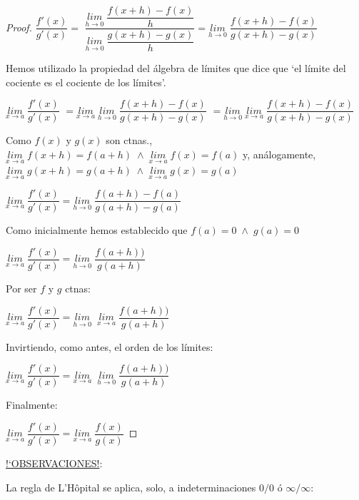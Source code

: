 	 
	\begin{proof}
		 
		 $\dfrac {f'(x)}{g'(x)}= $
		 $\dfrac 
		  { \underset {h\to 0}{lim}\;{\dfrac {f(x+h)-f(x)}{h}}} { \underset {h\to 0}{lim}\;{\dfrac {g(x+h)-g(x)}{h}} }= \underset {h\to 0}{lim}\;{\dfrac {f(x+h)-f(x)}{g(x+h)-g(x)}} $
		  
		  Hemos utilizado la propiedad del álgebra de límites que dice que `el límite del cociente es el cociente de los límites'.
		  
		  $\underset {x\to a}{lim }\; {\dfrac {f'(x)}{g'(x)}}$
		  $=\underset {x\to a}{lim} \; \underset {h\to 0}{lim}\; { \dfrac {f(x+h)-f(x)}{g(x+h)-g(x)}  }$
		   $=\underset {h\to 0}{lim} \; \underset {x\to a}{lim}\; { \dfrac {f(x+h)-f(x)}{g(x+h)-g(x)}  }$
		   
		   Como $f(x)$ y $g(x)$ son ctnas., $\underset {x\to a}{lim}\;{f(x+h)}=f(a+h) \; \wedge \; \underset {x\to a}{lim}\;{f(x)}=f(a) $ y, análogamente, $\underset {x\to a}{lim}\;{g(x+h)}=g(a+h) \; \wedge \; \underset {x\to a}{lim}\;{g(x)}=g(a) $ 
		   
		    $\underset {x\to a}{lim }\; {\dfrac {f'(x)}{g'(x)}}=\underset {h\to 0}{lim}\; { \dfrac {f(a+h)-f(a)}{g(a+h)-g(a)}}$
		    
		    Como inicialmente hemos establecido que $f(a)=0 \; \wedge \; g(a)=0$
		    
		      $ \underset {x\to a}{lim}\;{\dfrac {f'(x)}{g'(x)}}=\underset {h\to 0}{lim}\; { \dfrac {f(a+h))}{g(a+h)}}$
		      
		      Por ser $f$ y $g$ ctnas:
		      
		       $ \underset {x\to a}{lim}\; {\dfrac {f'(x)}{g'(x)}}=
		       \underset {h\to 0}{lim}\;\; \underset {x\to a}{lim}\; { \dfrac {f(a+h))}{g(a+h)}}$
		       
		       Invirtiendo, como antes, el orden de los límites:
		       
		       $ \underset {x\to a}{lim}\; {\dfrac {f'(x)}{g'(x)}}=
		       \underset {x\to a}{lim}\;\; \underset {h\to 0}{lim}\; { \dfrac {f(a+h))}{g(a+h)}}$
		       
		       Finalmente:
		       
		       $ \underset {x\to a}{lim}\; {\dfrac {f'(x)}{g'(x)}}=
		       \underset {x\to a}{lim}\; { \dfrac {f(x)}{g(x)}}$
		    
	\end{proof}
	
	\underline{!`OBSERVACIONES!}: 
	
		La regla de L'Hôpital se aplica, solo, a indeterminaciones $0/0$ ó $\infty/\infty$:
		
